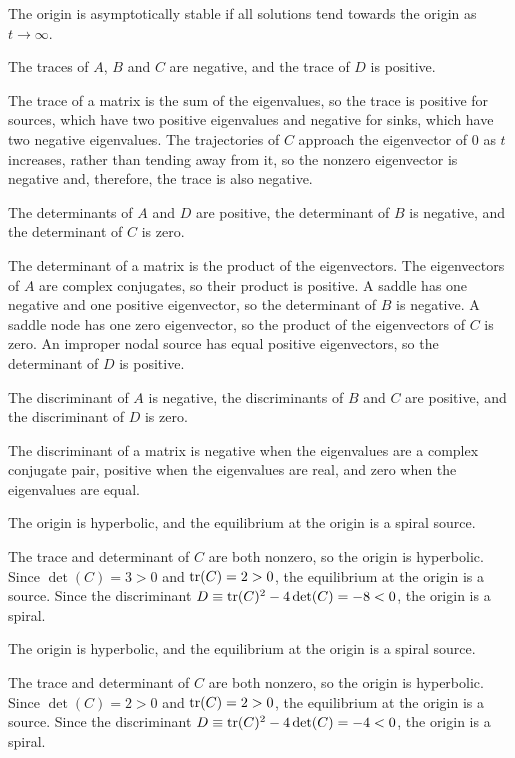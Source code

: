 \soln The origin is asymptotically stable if all solutions tend towards
the origin as $t \rightarrow \infty$.

 \ans The traces of $A$, $B$ and $C$ are negative, and the
trace of $D$ is positive.

\soln The trace of a matrix is the sum of the eigenvalues, so the trace
is positive for sources, which have two positive eigenvalues and
negative for sinks, which have two negative eigenvalues.  The trajectories
of $C$ approach the eigenvector of $0$ as $t$ increases, rather
than tending away from it, so the nonzero eigenvector is negative and,
therefore, the trace is also negative.

 \ans The determinants of $A$ and $D$ are positive, the
determinant of $B$ is negative, and the determinant of $C$ is zero.

\soln The determinant of a matrix is the product of the eigenvectors.  The
eigenvectors of $A$ are complex conjugates, so their product
is positive.  A saddle has one negative and one positive eigenvector, so
the determinant of $B$ is negative.  A saddle node has one zero
eigenvector, so the product of the eigenvectors of $C$ is zero.  An
improper nodal source has equal positive eigenvectors, so the determinant
of $D$ is positive.

 \ans The discriminant of $A$ is negative, the discriminants of
$B$ and $C$ are positive, and the discriminant of $D$ is zero.

\soln The discriminant of a matrix is negative when the eigenvalues are
a complex conjugate pair, positive when the eigenvalues are real, and
zero when the eigenvalues are equal.

 \ans The origin is hyperbolic, and the equilibrium at the origin
is a spiral source.

\soln The trace and determinant of $C$ are both nonzero, so the origin
is hyperbolic.  Since $\det(C) = 3 > 0$ and ${\rm tr}(C) = 2 > 0$,
the equilibrium at the origin is a source.  Since the discriminant
$D \equiv {\rm tr}(C)^2 - 4\det(C) = -8 < 0$, the origin is a spiral.

 \ans The origin is hyperbolic, and the equilibrium at the origin
is a spiral source.

\soln The trace and determinant of $C$ are both nonzero, so the origin
is hyperbolic.  Since $\det(C) = 2 > 0$ and ${\rm tr}(C) = 2 > 0$,
the equilibrium at the origin is a source.  Since the discriminant
$D \equiv {\rm tr}(C)^2 - 4\det(C) = -4 < 0$, the origin is a spiral.

